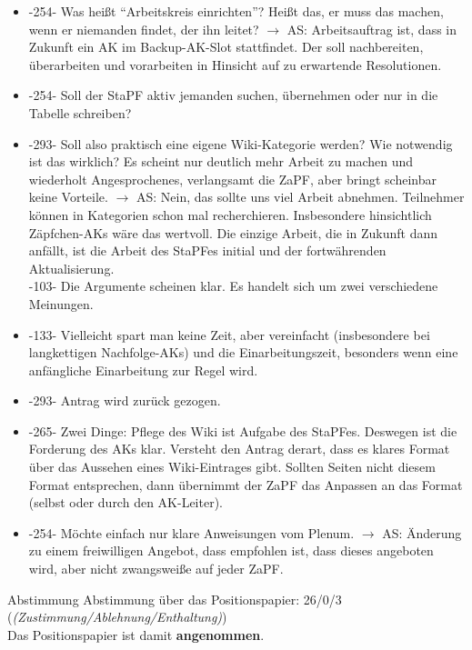     \begin{itemize}
      \item -254- Was heißt ``Arbeitskreis einrichten''? Heißt das, er muss das machen, wenn er niemanden findet, der ihn leitet?
        $\rightarrow$ AS: Arbeitsauftrag ist, dass in Zukunft ein AK im Backup-AK-Slot stattfindet. Der soll nachbereiten, überarbeiten und vorarbeiten in Hinsicht auf zu erwartende Resolutionen.
      \item -254- Soll der StaPF aktiv jemanden suchen, übernehmen oder nur in die Tabelle schreiben?
      \item -293- Soll also praktisch eine eigene Wiki-Kategorie werden? Wie notwendig ist das wirklich? Es scheint nur deutlich mehr Arbeit zu machen und wiederholt Angesprochenes, verlangsamt die ZaPF, aber bringt scheinbar keine Vorteile.
        $\rightarrow$ AS: Nein, das sollte uns viel Arbeit abnehmen. Teilnehmer können in Kategorien schon mal recherchieren.
      Insbesondere hinsichtlich Zäpfchen-AKs wäre das wertvoll. Die einzige Arbeit, die in Zukunft dann anfällt, ist die Arbeit des StaPFes initial und der fortwährenden Aktualisierung. \\
        -103- Die Argumente scheinen klar. Es handelt sich um zwei verschiedene Meinungen.
      \item -133- Vielleicht spart man keine Zeit, aber vereinfacht (insbesondere bei langkettigen Nachfolge-AKs) und  die Einarbeitungszeit, besonders wenn eine anfängliche Einarbeitung zur Regel wird.
      \item -293- Antrag wird zurück gezogen.
      \item -265- Zwei Dinge: Pflege des Wiki ist Aufgabe des StaPFes. Deswegen ist die Forderung des AKs klar.
      Versteht den Antrag derart, dass es klares Format über das Aussehen eines Wiki-Eintrages gibt. Sollten Seiten nicht diesem Format entsprechen, dann übernimmt der ZaPF das Anpassen an das Format (selbst oder durch den AK-Leiter).
      \item -254- Möchte einfach nur klare Anweisungen vom Plenum.
        $\rightarrow$ AS: Änderung zu einem freiwilligen Angebot, dass empfohlen ist, dass dieses angeboten wird, aber nicht zwangsweiße auf jeder ZaPF.
    \end{itemize}

    \begin{success}{Abstimmung}
      Abstimmung über das Positionspapier: 26/0/3 (\textit{(Zustimmung/Ablehnung/Enthaltung)}) \\
      Das Positionspapier ist damit \textbf{angenommen}.
    \end{success}

